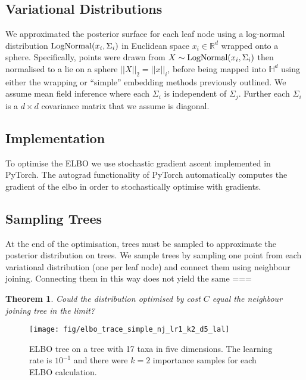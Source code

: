 \documentclass[11pt, twocolumn]{article}
\newtheorem{theorem}{Theorem}
\begin{document}
\subsection{Variational Distributions}
We approximated the posterior surface for each leaf node using a log-normal distribution $\textnormal{LogNormal}(x_{i}, \Sigma_{i})$ in Euclidean space $x_{i} \in \mathbb{R}^{d}$ wrapped onto a sphere.
Specifically, points were drawn from $X \sim \textnormal{LogNormal}(x_{i}, \Sigma_{i})$ then normalised to a lie on a sphere $||X||_{2} = ||x||_{i}$, before being mapped into $\mathbb{H}^{d}$ using either the wrapping or ``simple'' embedding methods previously outlined.
We assume mean field inference where each $\Sigma_{i}$ is independent of $\Sigma_{j}$.
Further each $\Sigma_{i}$ is a $d \times d$ covariance matrix that we assume is diagonal.

\subsection{Implementation}
To optimise the ELBO we use stochastic gradient ascent implemented in PyTorch.
The autograd functionality of PyTorch automatically computes the gradient of the elbo in order to stochastically optimise with gradients.

\subsection{Sampling Trees}
At the end of the optimisation, trees must be sampled to approximate the posterior distribution on trees.
We sample trees by sampling one point from each variational distribution (one per leaf node) and connect them using neighbour joining.
Connecting them in this way does not yield the same ===

\begin{theorem}
Could the distribution optimised by cost $C$ equal the neighbour joining tree in the limit?
\end{theorem}



\begin{figure}[htbp] \label{fig:elbo_trace}
\begin{center}
    \texttt{[image: fig/elbo\_trace\_simple\_nj\_lr1\_k2\_d5\_lal]}
\end{center}
\caption{ELBO tree on a tree with 17 taxa in five dimensions. The learning rate is $10^{-1}$ and there were $k=2$ importance samples for each ELBO calculation.}
\end{figure}
\end{document}
